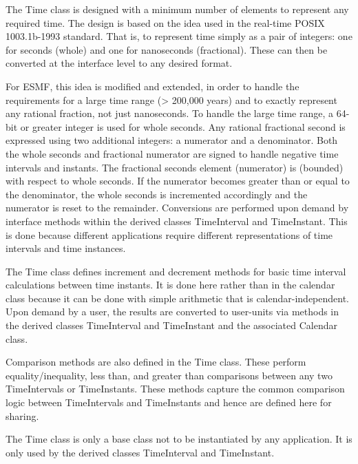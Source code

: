 
The Time class is designed with a minimum number of elements to represent
any required time.  The design is based on the idea used in the real-time
POSIX 1003.1b-1993 standard.  That is, to represent time simply as a pair of
integers: one for seconds (whole) and one for nanoseconds (fractional).
These can then be converted at the interface level to any desired format.

For ESMF, this idea is modified and extended, in order to handle the
requirements for a large time range (> 200,000 years) and to exactly
represent any rational fraction, not just nanoseconds.  To handle the
large time range, a 64-bit or greater integer is used for whole seconds.
Any rational fractional second is expressed using two additional integers:
a numerator and a denominator.  Both the whole seconds and fractional numerator
are signed to handle negative time intervals and instants.  The fractional
seconds element (numerator) is  (bounded)
with respect to whole seconds. If the numerator becomes greater than or equal
to the denominator, the whole seconds is incremented accordingly and the
numerator is reset to the remainder.  Conversions are performed upon demand
by interface methods within the derived classes TimeInterval and TimeInstant.
This is done because different applications require different representations
of time intervals and time instances.

The Time class defines increment and decrement methods for basic time
interval calculations between time instants.  It is done here rather than in
the calendar class because it can be done with simple arithmetic that is
calendar-independent.  Upon demand by a user, the results are converted to
user-units via methods in the derived classes TimeInterval and TimeInstant
and the associated Calendar class.

Comparison methods are also defined in the Time class.  These perform
equality/inequality, less than, and greater than comparisons between any two
TimeIntervals or TimeInstants.  These methods capture the common comparison
logic between TimeIntervals and TimeInstants and hence are defined here for
sharing.

The Time class is only a base class not to be instantiated by any application.
It is only used by the derived classes TimeInterval and TimeInstant.
